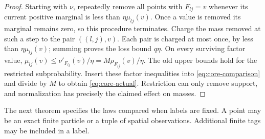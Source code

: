 \begin{proof}
Starting with $\nu$, repeatedly remove all points with
$F_{lj}=v$ whenever its current positive marginal is less than
$\eta\mu_{lj}(v)$.  Once a value is removed its marginal remains zero,
so this procedure terminates.  Charge the mass removed at such a step
to the pair $((l,j),v)$.  Each pair is charged at most once, by less
than $\eta\mu_{lj}(v)$; summing proves the loss bound $q\eta$.
On every surviving factor value,
$\mu_{lj}(v)\le\nu'_{F_{lj}}(v)/\eta
=M\rho_{F_{lj}}(v)/\eta$.
The old upper bounds hold for the restricted subprobability.  Insert
these factor inequalities into \eqref{eq:core-comparison} and divide
by $M$ to obtain \eqref{eq:core-actual}.  Restriction can only remove
support, and normalization has precisely the claimed effect on masses.
\end{proof}

The next theorem specifies the laws compared when labels are fixed.
A point may be an exact finite particle or a tuple of spatial
observations.  Additional finite tags may be included in a label.

